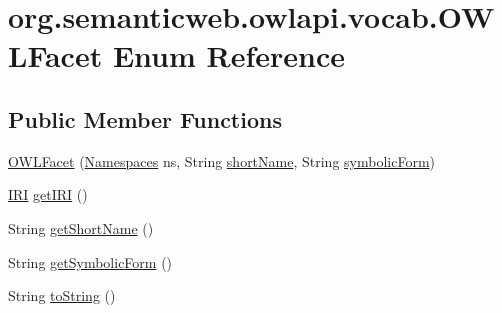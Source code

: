 \hypertarget{enumorg_1_1semanticweb_1_1owlapi_1_1vocab_1_1_o_w_l_facet}{\section{org.\-semanticweb.\-owlapi.\-vocab.\-O\-W\-L\-Facet Enum Reference}
\label{enumorg_1_1semanticweb_1_1owlapi_1_1vocab_1_1_o_w_l_facet}
}
\subsection*{Public Member Functions}
\begin{DoxyCompactItemize}
\item 
\hyperlink{enumorg_1_1semanticweb_1_1owlapi_1_1vocab_1_1_o_w_l_facet_ad10695ad961cea730966294da823aafa}{O\-W\-L\-Facet} (\hyperlink{enumorg_1_1semanticweb_1_1owlapi_1_1vocab_1_1_namespaces}{Namespaces} ns, String \hyperlink{enumorg_1_1semanticweb_1_1owlapi_1_1vocab_1_1_o_w_l_facet_a11866bbbe812f44e207fabbf8caa75b8}{short\-Name}, String \hyperlink{enumorg_1_1semanticweb_1_1owlapi_1_1vocab_1_1_o_w_l_facet_a99a2d7c0adde6f2bf6b87fdf7c66e20e}{symbolic\-Form})
\item 
\hyperlink{classorg_1_1semanticweb_1_1owlapi_1_1model_1_1_i_r_i}{I\-R\-I} \hyperlink{enumorg_1_1semanticweb_1_1owlapi_1_1vocab_1_1_o_w_l_facet_a493a239e5dace28072f0b0fc028d0904}{get\-I\-R\-I} ()
\item 
String \hyperlink{enumorg_1_1semanticweb_1_1owlapi_1_1vocab_1_1_o_w_l_facet_aa4159d24e98fa7495fd5dd4595c84269}{get\-Short\-Name} ()
\item 
String \hyperlink{enumorg_1_1semanticweb_1_1owlapi_1_1vocab_1_1_o_w_l_facet_a770c07745c22f1a468ddeaea7bece48a}{get\-Symbolic\-Form} ()
\item 
String \hyperlink{enumorg_1_1semanticweb_1_1owlapi_1_1vocab_1_1_o_w_l_facet_a2e01871e243ef8bc05179a9fc322a85e}{to\-String} ()
\end{DoxyCompactItemize}
